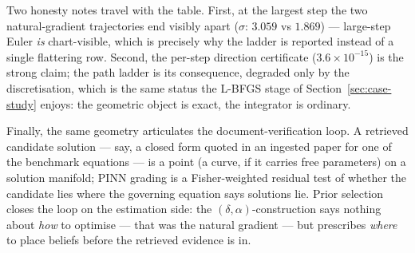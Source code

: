Two honesty notes travel with the table.  First, at the largest step the two
natural-gradient trajectories end visibly apart ($\sigma$: $3.059$ vs
$1.869$) --- large-step Euler \emph{is} chart-visible, which is precisely why
the ladder is reported instead of a single flattering row.  Second, the
per-step direction certificate ($3.6\times10^{-15}$) is the strong claim;
the path ladder is its consequence, degraded only by the discretisation,
which is the same status the L-BFGS stage of
Section~\ref{sec:case-study} enjoys: the geometric object is exact, the
integrator is ordinary.

Finally, the same geometry articulates the document-verification loop. A
retrieved candidate solution --- say, a closed form quoted in an ingested
paper for one of the benchmark equations --- is a point (a curve, if it
carries free parameters) on a solution manifold; PINN grading is a
Fisher-weighted residual test of whether the candidate lies where the
governing equation says solutions lie. Prior selection closes the loop on
the estimation side: the $(\delta,\alpha)$-construction says nothing about
\emph{how} to optimise --- that was the natural gradient --- but prescribes
\emph{where} to place beliefs before the retrieved evidence is in.


